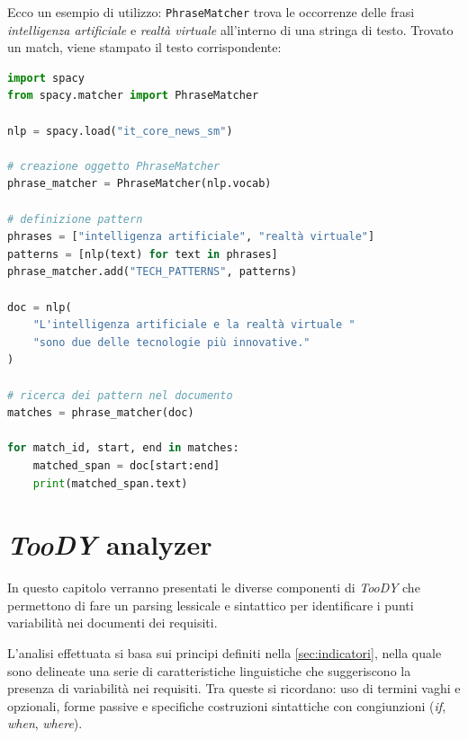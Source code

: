 \documentclass[12pt]{report}
\newcommand{\torevise}[1]{\textcolor{red}{#1}}
\newcommand{\toody}{\textsl{TooDY}\xspace}
\begin{document}
\begin{mdframed}
\small
Ecco un esempio di utilizzo: \texttt{PhraseMatcher} trova le occorrenze delle frasi \textit{intelligenza artificiale} e \textit{realtà virtuale} all'interno di una stringa di testo. Trovato un match, viene stampato il testo corrispondente:

\begin{lstlisting}[language=Python]
import spacy
from spacy.matcher import PhraseMatcher

nlp = spacy.load("it_core_news_sm")

# creazione oggetto PhraseMatcher
phrase_matcher = PhraseMatcher(nlp.vocab)

# definizione pattern
phrases = ["intelligenza artificiale", "realtà virtuale"]
patterns = [nlp(text) for text in phrases]
phrase_matcher.add("TECH_PATTERNS", patterns)

doc = nlp(
    "L'intelligenza artificiale e la realtà virtuale "
    "sono due delle tecnologie più innovative."
)

# ricerca dei pattern nel documento
matches = phrase_matcher(doc)

for match_id, start, end in matches:
    matched_span = doc[start:end]
    print(matched_span.text)
\end{lstlisting}
\end{mdframed}


\clearpage\thispagestyle{empty}
\null\newpage




\chapter{\toody analyzer}
\label{ch:parser}
In questo capitolo verranno presentati le diverse componenti di \toody che permettono di fare un parsing lessicale e sintattico per identificare i punti variabilità nei documenti dei requisiti.

L'analisi effettuata si basa sui principi definiti nella \cref{sec:indicatori}, nella quale sono delineate una serie di caratteristiche linguistiche che suggeriscono la presenza di variabilità nei requisiti. Tra queste si ricordano: uso di termini vaghi e opzionali, forme passive e specifiche costruzioni sintattiche con congiunzioni (\textit{if}, \textit{when}, \textit{where}).
\end{document}
